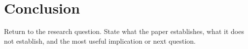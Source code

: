 \section{Conclusion}\label{sec:conclusion}

Return to the research question. State what the paper establishes, what it does
not establish, and the most useful implication or next question.
